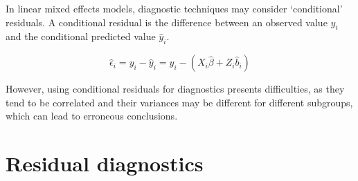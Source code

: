 \documentclass[12pt, a4paper]{report}
\theoremstyle{plain}
\theoremstyle{definition}
\theoremstyle{remark}
\begin{document}

In linear mixed effects models, diagnostic techniques may consider `conditional' residuals. A conditional residual is the difference between an observed value $y_{i}$ and the conditional predicted value $\hat{y}_{i} $.

\[ \hat{\epsilon}_{i} = y_{i} - \hat{y}_{i} = y_{i} - ( X_{i}\hat{\beta} + Z_{i}\hat{b}_{i}) \]

However, using conditional residuals for diagnostics presents difficulties, as they tend to be correlated and their variances may be different for different subgroups, which can lead to erroneous conclusions.


\section{Residual diagnostics} %







%
%
%
%

\end{document}
